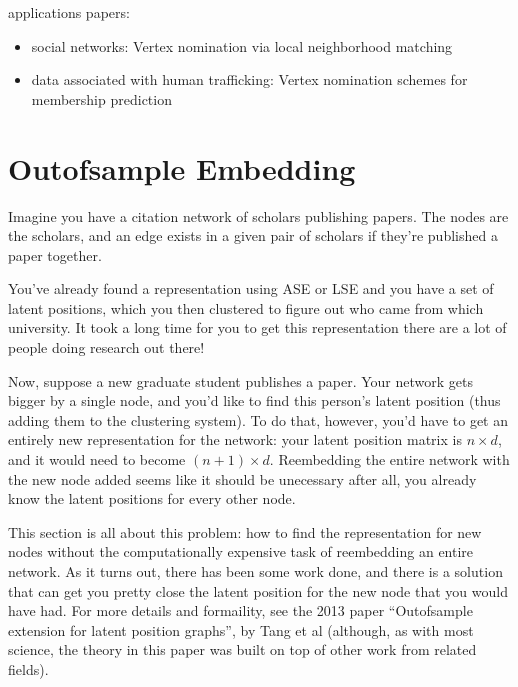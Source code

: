 \documentclass[letterpaper,10pt,english]{jupyterBook}
\begin{document}
\sphinxAtStartPar
applications papers:
\begin{itemize}
\item {} 
\sphinxAtStartPar
social networks: Vertex nomination via local neighborhood matching

\item {} 
\sphinxAtStartPar
data associated with human trafficking: Vertex nomination schemes for membership prediction

\end{itemize}


\section{Out\sphinxhyphen{}of\sphinxhyphen{}sample Embedding}
\label{\detokenize{applications/ch8/out-of-sample:out-of-sample-embedding}}\label{\detokenize{applications/ch8/out-of-sample::doc}}
\sphinxAtStartPar
Imagine you have a citation network of scholars publishing papers. The nodes are the scholars, and an edge exists in a given pair of scholars if they’re published a paper together.

\sphinxAtStartPar
You’ve already found a representation using ASE or LSE and you have a set of latent positions, which you then clustered to figure out who came from which university. It took a long time for you to get this representation \sphinxhyphen{} there are a lot of people doing research out there!

\sphinxAtStartPar
Now, suppose a new graduate student publishes a paper. Your network gets bigger by a single node, and you’d like to find this person’s latent position (thus adding them to the clustering system). To do that, however, you’d have to get an entirely new representation for the network: your latent position matrix is \(n \times d\), and it would need to become \((n+1) \times d\). Re\sphinxhyphen{}embedding the entire network with the new node added seems like it should be unecessary \sphinxhyphen{} after all, you already know the latent positions for every other node.

\sphinxAtStartPar
This section is all about this problem: how to find the representation for new nodes without the computationally expensive task of re\sphinxhyphen{}embedding an entire network. As it turns out, there has been some work done, and there is a solution that can get you pretty close the latent position for the new node that you would have had. For more details and formaility, see the 2013 paper “Out\sphinxhyphen{}of\sphinxhyphen{}sample extension for latent position graphs”, by Tang et al (although, as with most science, the theory in this paper was built on top of other work from related fields).
\end{document}
